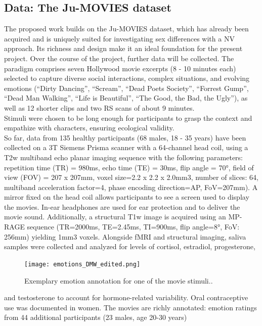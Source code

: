\documentclass[11pt,a4paper]{article}
\begin{document}
\subsection*{Data: The Ju-MOVIES dataset}
The proposed work builds on the Ju-MOVIES dataset, which has already been acquired and is 
uniquely suited for investigating sex differences with a NV approach. Its richness and design make it an ideal foundation for the present project. 
Over the course of the project, further data will be collected.
The paradigm comprises seven Hollywood movie excerpts (8 - 10 minutes each) selected to capture diverse social 
interactions, complex situations, and evolving emotions (“Dirty Dancing”, “Scream”, “Dead Poets Society”, “Forrest Gump”, “Dead Man Walking”, “Life is Beautiful”, 
“The Good, the Bad, the Ugly”), as well as 12 shorter clips and two RS scans of about 9 minutes. \\
Stimuli were chosen to be long enough for participants to grasp the context and empathize with characters, 
ensuring ecological validity.\\
So far, data from 135 healthy participants (68 males, 18 - 35 years) have been collected 
on a 3T Siemens Prisma scanner
with a 64-channel head coil, using a T2w multiband echo planar imaging sequence with the 
following parameters: repetition time (TR) = 980ms, echo time (TE) = 30ms, flip angle = 70°, field of view 
(FOV) = 207 x 207mm, voxel size=2.2 x 2.2 x 2.0mm3, number of slices: 64, multiband acceleration factor=4, 
phase encoding direction=AP,  FoV=207mm). A mirror fixed on the head coil allows participants to see a screen used 
to display the movies. In-ear headphones are used for ear protection and to deliver the movie sound. 
Additionally, a structural T1w image is acquired using an MP-RAGE sequence (TR=2000ms, TE=2.45ms, TI=900ms, 
flip angle=8°, FoV: 256mm) yielding 1mm3 voxels.
Alongside fMRI and structural imaging, saliva samples were collected and analyzed for levels of cortisol, estradiol, progesterone,
\begin{figure} %
  \vspace{-10pt} %
  \texttt{[image: emotions\_DMW\_edited.png]}
  \caption{Exemplary emotion annotation for one of the movie stimuli..}
  \label{fig:dmw}
\end{figure}
 and testosterone to account for hormone-related variability. 
Oral contraceptive use was documented in women.
The movies are richly annotated: 
emotion ratings from 44 additional participants (23 males, age 20-30 years)
\end{document}
